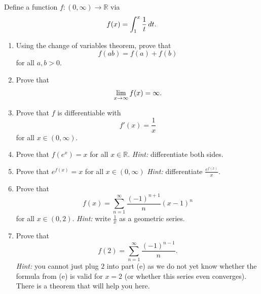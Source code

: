 \documentclass[11pt]{article}
\begin{document}
    Define a function $f : (0, \infty) \to \mathbb{R}$ via
    \begin{equation*}
        f(x) = \int_{1}^{x} \frac{1}{t}\,dt.\\[5pt]
    \end{equation*}
    \begin{enumerate}[label=(\alph*)]
        \item 
        Using the change of variables theorem, prove that
        \begin{equation*}
            f(ab) = f(a) + f(b)
        \end{equation*}
        for all $a, b > 0$.

        \item 
        Prove that
        \begin{equation*}
            \lim_{x \to \infty} f(x) = \infty.\\[5pt]
        \end{equation*}

        \item 
        Prove that $f$ is differentiable with
        \begin{equation*}
            f'(x) = \frac{1}{x}
        \end{equation*}
        for all $x \in (0, \infty)$.

        \item 
        Prove that $f(e^x) = x$ for all $x \in \mathbb{R}$. \textit{Hint:} differentiate both sides.

        \item 
        Prove that $e^{f(x)} = x$ for all $x \in (0, \infty)$ \textit{Hint:} differentiate $\frac{e^{f(x)}}{x}$.

        \item 
        Prove that
        \begin{equation*}
            f(x) = \sum_{n = 1}^{\infty} \frac{(-1)^{n + 1}}{n} (x - 1)^n
        \end{equation*}
        for all $x \in (0, 2)$. \textit{Hint:} write $\frac{1}{x}$ as a geometric series.

        \item 
        Prove that
        \begin{equation*}
            f(2) = \sum_{n = 1}^{\infty} \frac{(-1)^{n - 1}}{n}.
        \end{equation*}
        \textit{Hint:} you cannot just plug $2$ into part (e) as we do not yet know whether the formula from (e) is valid for $x = 2$ (or whether this series even converges). There is a theorem that will help you here.
        
    \end{enumerate}
\end{document}
